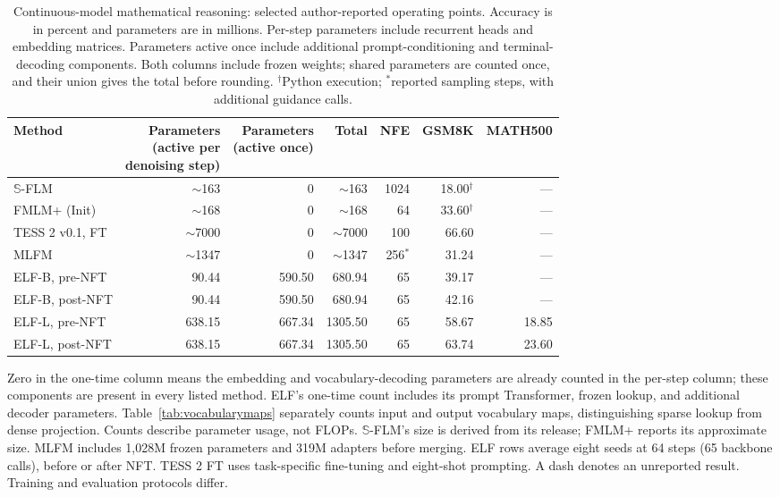 \begin{table}[t]
\caption{Continuous-model mathematical reasoning: selected author-reported operating points. Accuracy is in percent and parameters are in millions. Per-step parameters include recurrent heads and embedding matrices. Parameters active once include additional prompt-conditioning and terminal-decoding components. Both columns include frozen weights; shared parameters are counted once, and their union gives the total before rounding. $^\dagger$Python execution; $^*$reported sampling steps, with additional guidance calls.}
\label{tab:literature}
\centering\small
\setlength{\tabcolsep}{2.5pt}
\begin{tabular}{@{}lrrrrrr@{}}
\toprule
Method & \shortstack{Parameters\\(active per\\denoising step)} & \shortstack{Parameters\\(active once)} & Total & NFE & GSM8K & MATH500\\
\midrule
$\mathbb S$-FLM \citep{hyperspherical} & $\sim$163 & 0 & $\sim$163 & 1024 & 18.00$^\dagger$ & ---\\
FMLM+ (Init) \citep{posterior} & $\sim$168 & 0 & $\sim$168 & 64 & 33.60$^\dagger$ & ---\\
TESS 2 v0.1, FT \citep{tess2} & $\sim$7000 & 0 & $\sim$7000 & 100 & 66.60 & ---\\
MLFM \citep{mlfm} & $\sim$1347 & 0 & $\sim$1347 & 256$^*$ & 31.24 & ---\\
\midrule
ELF-B, pre-NFT & 90.44 & 590.50 & 680.94 & 65 & 39.17 & ---\\
ELF-B, post-NFT & 90.44 & 590.50 & 680.94 & 65 & 42.16 & ---\\
ELF-L, pre-NFT & 638.15 & 667.34 & 1305.50 & 65 & 58.67 & 18.85\\
ELF-L, post-NFT & 638.15 & 667.34 & 1305.50 & 65 & 63.74 & 23.60\\
\bottomrule
\end{tabular}
\vspace{2pt}
\parbox{\linewidth}{\footnotesize Zero in the one-time column means the embedding and vocabulary-decoding parameters are already counted in the per-step column; these components are present in every listed method. ELF's one-time count includes its prompt Transformer, frozen lookup, and additional decoder parameters. Table~\ref{tab:vocabularymaps} separately counts input and output vocabulary maps, distinguishing sparse lookup from dense projection. Counts describe parameter usage, not FLOPs. $\mathbb S$-FLM's size is derived from its release; FMLM+ reports its approximate size. MLFM includes 1,028M frozen parameters and 319M adapters before merging. ELF rows average eight seeds at 64 steps (65 backbone calls), before or after NFT. TESS 2 FT uses task-specific fine-tuning and eight-shot prompting. A dash denotes an unreported result. Training and evaluation protocols differ.}
\end{table}
